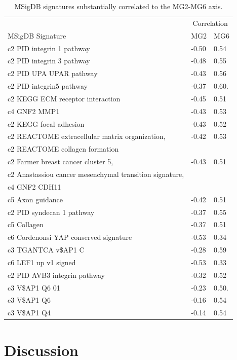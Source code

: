 \documentclass[dissertation.tex]{subfiles}
\begin{document}
\begin{table}[ht]
\caption{\acrshort{MSigDB} signatures substantially correlated to the MG2-MG6 axis.}
\label{tbl:sigs-msigdb-corrs-mg26}
\centering
\begin{tabularx}{\textwidth}{ @{} X l l @{} }
  \toprule
   & \multicolumn{2}{c}{Correlation} \\
  MSigDB Signature & MG2 & MG6 \\ 
  \midrule
  c2 PID integrin 1 pathway & -0.50 & 0.54 \\ 
  c2 PID integrin 3 pathway & -0.48 & 0.55 \\ 
  c2 PID UPA UPAR pathway & -0.43 & 0.56 \\ 
  c2 PID integrin5 pathway & -0.37 & 0.60.\\ 
  c2 KEGG ECM receptor interaction & -0.45 & 0.51 \\ 
  c4 GNF2 MMP1 & -0.43 & 0.53 \\ 
  c2 KEGG focal adhesion & -0.43 & 0.52 \\ 
  c2 REACTOME extracellular matrix organization, & -0.42 & 0.53 \\ 
  c2 REACTOME collagen formation & & \\
  c2 Farmer breast cancer cluster 5, & -0.43 & 0.51 \\ 
  c2 Anastassiou cancer mesenchymal transition signature, & & \\
  c4 GNF2 CDH11 & & \\
  c5 Axon guidance & -0.42 & 0.51 \\ 
  c2 PID syndecan 1 pathway & -0.37 & 0.55 \\ 
  c5 Collagen & -0.37 & 0.51 \\ 
  c6 Cordenonsi YAP conserved signature & -0.53 & 0.34 \\ 
  c3 TGANTCA v\$AP1 C & -0.28 & 0.59 \\ 
  c6 LEF1 up v1 signed & -0.53 & 0.33 \\ 
  c2 PID AVB3 integrin pathway & -0.32 & 0.52 \\ 
  c3 V\$AP1 Q6 01 & -0.23 & 0.50.\\ 
  c3 V\$AP1 Q6 & -0.16 & 0.54 \\ 
  c3 V\$AP1 Q4 & -0.14 & 0.54 \\ 
   \bottomrule
\end{tabularx}
\end{table}


\section{Discussion}
\end{document}
